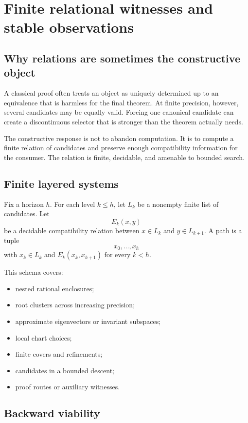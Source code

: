 \section{Finite relational witnesses and stable observations}

\subsection{Why relations are sometimes the constructive object}

A classical proof often treats an object as uniquely determined up to an equivalence that is harmless for the final theorem.  At finite precision, however, several candidates may be equally valid.  Forcing one canonical candidate can create a discontinuous selector that is stronger than the theorem actually needs.

The constructive response is not to abandon computation.  It is to compute a finite relation of candidates and preserve enough compatibility information for the consumer.  The relation is finite, decidable, and amenable to bounded search.

\subsection{Finite layered systems}

Fix a horizon \(h\).  For each level \(k\le h\), let \(L_k\) be a nonempty finite list of candidates.  Let
\[
 E_k(x,y)
\]
be a decidable compatibility relation between \(x\in L_k\) and \(y\in L_{k+1}\).  A path is a tuple
\[
 x_0,\ldots,x_h
\]
with \(x_k\in L_k\) and \(E_k(x_k,x_{k+1})\) for every \(k<h\).

This schema covers:
\begin{itemize}
\item nested rational enclosures;
\item root clusters across increasing precision;
\item approximate eigenvectors or invariant subspaces;
\item local chart choices;
\item finite covers and refinements;
\item candidates in a bounded descent;
\item proof routes or auxiliary witnesses.
\end{itemize}

\subsection{Backward viability}

